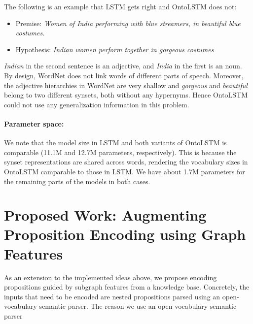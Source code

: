The following is an example that LSTM gets right and OntoLSTM does not:
\begin{itemize}
 \item Premise: \textit{Women of India performing with blue streamers, in beautiful blue costumes.}
 \item Hypothesis: \textit{Indian women perform together in gorgeous costumes}
\end{itemize}
\textit{Indian} in the second sentence is an adjective, and \textit{India} in the first is an noun. By design, WordNet does not link words of different parts of speech. Moreover, the adjective hierarchies in WordNet are very shallow and \textit{gorgeous} and \textit{beautiful} belong to two different synsets, both without any hypernyms. Hence OntoLSTM could not use any generalization information in this problem.

\paragraph{Parameter space:} We note that the model size in LSTM and both variants of OntoLSTM is comparable (11.1M and 12.7M parameters, respectively). This is because the synset representations are shared across words, rendering the vocabulary sizes in OntoLSTM camparable to those in LSTM. We have about 1.7M parameters for the remaining parts of the models in both cases. 

\section{Proposed Work: Augmenting Proposition Encoding using Graph Features}
As an extension to the implemented ideas above, we propose encoding propositions guided by subgraph features from a knowledge base. Concretely, the inputs that need to be encoded are nested propositions parsed using an open-vocabulary semantic parser. The reason we use an open vocabulary
semantic parser 
